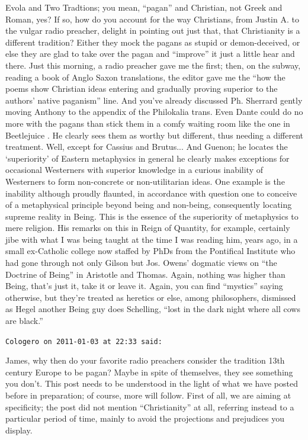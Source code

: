 \begin{footnotesize}
\begin{sffamily}
Evola and Two Tradtions; you mean, ``pagan'' and Christian, not Greek and Roman, yes? If so, how do you account for the way Christians, from Justin A. to the vulgar radio preacher, delight in pointing out just that, that Christianity is a different tradition? Either they mock the pagans as stupid or demon-deceived, or else they are glad to take over the pagan and ``improve'' it just a little hear and there. Just this morning, a radio preacher gave me the first; then, on the subway, reading a book of Anglo Saxon translations, the editor gave me the ``how the poems show Christian ideas entering and gradually proving superior to the authors' native paganism'' line. And you've already discussed Ph. Sherrard gently moving Anthony to the appendix of the Philokalia trans. Even Dante could do no more with the pagans than stick them in a comfy waiting room like the one in Beetlejuice . He clearly sees them as worthy but different, thus needing a different treatment. Well, except for Cassius and Brutus... And Guenon; he locates the `superiority' of Eastern metaphysics in general he clearly makes exceptions for occasional Westerners with superior knowledge in a curious inability of Westerners to form non-concrete or non-utilitarian ideas. One example is the inability although proudly flaunted, in accordance with question one to conceive of a metaphysical principle beyond being and non-being, consequently locating supreme reality in Being. This is the essence of the superiority of metaphysics to mere religion. His remarks on this in Reign of Quantity, for example, certainly jibe with what I was being taught at the time I was reading him, years ago, in a small ex-Catholic college now staffed by PhDs from the Pontifical Institute who had gone through not only Gilson but Jos. Owens' dogmatic views on ``the Doctrine of Being'' in Aristotle and Thomas. Again, nothing was higher than Being, that's just it, take it or leave it. Again, you can find ``mystics'' saying otherwise, but they're treated as heretics or else, among philosophers, dismissed as Hegel another Being guy does Schelling, ``lost in the dark night where all cows are black.''

\hfill

\texttt{Cologero on 2011-01-03 at 22:33 said:}

James, why then do your favorite radio preachers consider the tradition 13th century Europe to be pagan? Maybe in spite of themselves, they see something you don't. This post needs to be understood in the light of what we have posted before in preparation; of course, more will follow. First of all, we are aiming at specificity; the post did not mention ``Christianity'' at all, referring instead to a particular period of time, mainly to avoid the projections and prejudices you display.


\end{sffamily}
\end{footnotesize}
